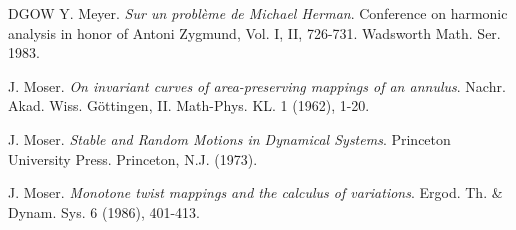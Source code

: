 \documentclass{amsart}
\newcounter{item}[section]
\theoremstyle{definition}
\begin{document}
\begin{thebibliography}{DGOW}
			  Y. Meyer. {\it
				Sur un probl\`{e}me de Michael Herman}. Conference on harmonic analysis in honor of Antoni Zygmund, Vol. I, II, 726-731.
			Wadsworth Math. Ser.  1983.
			
			
			 J. Moser. {\it On invariant curves of area-preserving mappings of an annulus}. Nachr. Akad. Wiss. G\"{o}ttingen,
			II. Math-Phys. KL. {1} (1962), 1-20.
			
			  J. Moser. {\it Stable and Random Motions in Dynamical Systems}. Princeton University
			Press. Princeton, N.J. (1973).
			
			 J. Moser.  {\it Monotone twist mappings and the calculus of variations}. Ergod.
			Th. \& Dynam. Sys. {6} (1986), 401-413.
			
			
			

\end{thebibliography}
\end{document}
